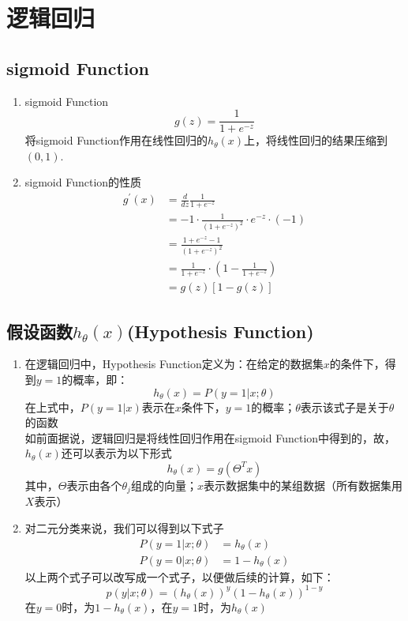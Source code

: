 \section{逻辑回归}
\subsection{sigmoid Function}
\begin{enumerate}
	\item sigmoid Function
	\begin{equation}
		g(z) = \frac{1}{1+e^{-z}}
	\end{equation}
	将sigmoid Function作用在线性回归的$h_\theta(x)$上，将线性回归的结果压缩到$(0,1)$.
	\item sigmoid Function的性质
	\begin{align}
		g^{'}{(x)} &= \frac{d}{dz}\frac{1}{1+e^{-z}} \\
		&= -1 \cdot \frac{1}{(1+e^{-z})^2} \cdot e^{-z} \cdot (-1) \\
		&= \frac{1+e^{-z} - 1}{(1+e^{-z})^2} \\
		&= \frac{1}{1+e^{-z}} \cdot \left( 1- \frac{1}{1+e^{-z}} \right) \\
		&= g(z)\left[1-g(z)\right]
	\end{align}
\end{enumerate}

\subsection{假设函数$h_\theta(x)$(Hypothesis Function)}
\begin{enumerate}
	\item 在逻辑回归中，Hypothesis Function定义为：在给定的数据集$x$的条件下，得到$y=1$的概率，即：
	\begin{equation}
		h_\theta(x) = P(y=1|x; \theta)
	\end{equation}
	在上式中，$P(y=1|x)$表示在$x$条件下，$y=1$的概率；$\theta$表示该式子是关于$\theta$的函数 \\
	如前面据说，逻辑回归是将线性回归作用在sigmoid Function中得到的，故，$h_\theta(x)$还可以表示为以下形式
	\begin{equation}
		h_\theta(x) = g(\Theta^Tx)
	\end{equation}
	其中，$\Theta$表示由各个$\theta_j$组成的向量；$x$表示数据集中的某组数据（所有数据集用$X$表示）

	\item 对二元分类来说，我们可以得到以下式子
	\begin{align}
		P(y=1|x;\theta) &= h_\theta(x) \\
		P(y=0|x;\theta) &= 1- h_\theta(x)
	\end{align}
	以上两个式子可以改写成一个式子，以便做后续的计算，如下：
	\begin{equation}
		p(y|x;\theta) = \left( h_\theta(x) \right)^y \left( 1-h_\theta(x) \right)^{1-y}
	\end{equation}
	在$y=0$时，为$1- h_\theta(x)$，在$y=1$时，为$h_\theta(x)$
\end{enumerate}

